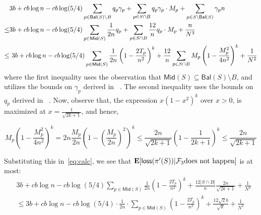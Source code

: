 \documentclass[11pt]{llncs}
\newcommand{\Mid}{{\mathsf{Mid}}}
\newcommand{\Bal}{{\mathsf{Bal}}}
\newcommand{\E}{\mathbf{E}}
\newcommand{\loss}{{\textsf{loss}}}
\begin{document}
 \begin{align}
     &  3 b+ cb \log n - c b \log(5/4) \sum_{p \in \Bal(S) \setminus B} q_p \gamma_p  + \sum_{p \in S \cap B} q_p \gamma_p \cdot M_p   + \sum_{p \in S \setminus \Bal(S)} \gamma_p n\notag \\
     \leq &  3 b+ cb \log n - c b \log(5/4) \sum_{p \in \Mid(S)} \frac{1}{2n} q_p  + \sum_{p \in S \cap B} \frac{12}{n} q_p \cdot M_p +  \frac{n}{N^3} \notag \\
      \leq & \ 3b + cb \log n - c b \log(5/4) \sum_{p \in \Mid(S)} \frac{1}{2n} \left( 1 - \frac{2T_p}{n^2} \right)^k   + \frac{12}{n} \sum_{p \in S \cap B}  M_p \left(1 - \frac{M_p^2}{4n^2}\right)^k + \frac{1}{N^2} \label{eq:calc}
    \end{align}
    where the first inequality uses the observation that $\Mid(S) \subseteq \Bal(S) \setminus B$, and utilizes the bounds on $\gamma_p$ derived in ~. The second inequality uses the bounds on $q_p$ derived in ~.
     Now, observe that, the expression $x (1 - x^2 )^k$ over $x > 0$, is maximized at $x = \frac{1}{\sqrt{2k + 1}}$, and hence,     
     
    $$M_p \left(1 - \frac{M_p^2}{4n^2}\right)^k =  2n \frac{M_p}{2n} \left(1 - \left(\frac{M_p}{2n}\right)^2\right)^k \le \frac{2n}{\sqrt{2k + 1}} \left(1 - \frac{1}{2k + 1} \right)^k \le \frac{2n}{\sqrt{2k + 1}}$$
    
    Substituting this in~\eqref{eq:calc}, we see that $\E[\loss(\pi'(S)) | {\cal F}_3 \text{does not happen}]$ is at most:
    \begin{align*}
&3b + cb \log n  - cb \log (5/4) \sum_{p \in \Mid(S)} \frac{1}{2n} \left( 1 - \frac{2T_p}{n^2} \right)^k  + \frac{12 |S \cap B|}{n} \frac{2n}{\sqrt{2k + 1}} + \frac{1}{N^2}\\
         & \leq 3b + cb \log n  - cb \log (5/4) \cdot \frac{1}{2n} \cdot \sum_{p \in \Mid(S)}  \left( 1 - \frac{2T_p}{n^2} \right)^k  + \frac{12 \sqrt{2} b}{\sqrt{k}} + \frac{1}{N^2}
    \end{align*}
    
\end{document}
